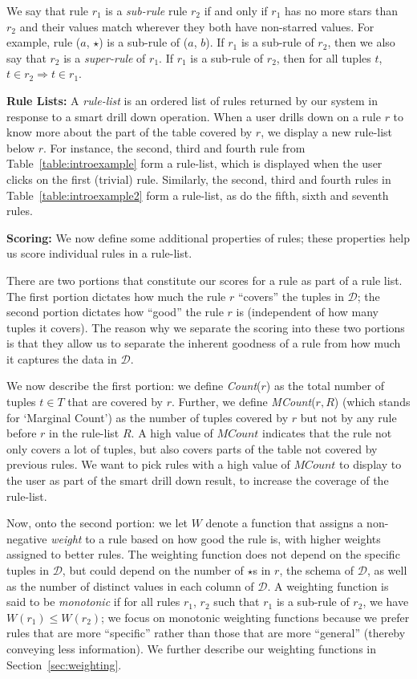 \documentclass[10pt,journal,compsoc]{IEEEtran}
\newcommand{\stitle}[1]{\vspace{0.5em}\noindent\textbf{#1}}
\newcommand{\calD}{\mathcal{D}\xspace}
\begin{document}
We say that rule $r_1$ is a {\em sub-rule} rule $r_2$ if and only if $r_1$ has no more stars than $r_2$ and their values match wherever they both have non-starred values. For example, rule ($a$, $\star$) is a sub-rule of ($a$, $b$). If $r_1$ is a sub-rule of $r_2$, then we also say that $r_2$ is a {\em super-rule} of $r_1$. If $r_1$ is a sub-rule of $r_2$, then for all tuples $t$, $t \in r_2 \Rightarrow t \in r_1$. 

\stitle{Rule Lists:}
A {\em rule-list} is an ordered list of rules returned by our system in response to a smart drill down operation. 
When a user drills down on a rule $r$ to know more about the part of the table covered by $r$, we display a new rule-list below $r$.
For instance, the second, third and fourth rule from Table~\ref{table:introexample} form a rule-list, which is displayed when the user clicks on the first (trivial) rule. Similarly, the second, third and fourth rules in Table~\ref{table:introexample2} form a rule-list, as do the fifth, sixth and seventh rules. 

\stitle{Scoring:} We now define some additional properties of rules; these properties
help us score individual rules in a rule-list. 

There are two portions that constitute our scores for a rule as part of a rule list. 
The first portion dictates how much the rule $r$ ``covers'' the tuples in $\calD$;
the second portion dictates how ``good'' the rule $r$ is (independent of how many
tuples it covers). 
The reason why we separate the scoring into these two portions is
that they allow us to separate the inherent goodness of a rule from
how much it captures the data in $\calD$.

We now describe the first portion:
we define {\em Count}($r$) as the total number of tuples $t \in T$ that are covered by $r$. 
Further, we define {\em MCount}($r, R$) (which stands for `Marginal Count') as the number of tuples covered by $r$ but not by any rule before $r$ in the rule-list $R$. A high value of $MCount$ indicates that the rule not only covers a lot of tuples, but also covers parts of the table not covered by previous rules. We want to pick rules with a high value of $MCount$ to display to the user
as part of the smart drill down result, to increase the coverage of the rule-list. 

Now, onto the second portion: we let $W$ denote a function that assigns a non-negative {\em weight} to a rule based on how good the rule is, with higher weights assigned to better rules. 
The weighting function does not depend on the specific
tuples in $\calD$, but could 
depend on the number of $\star$s in $r$,
the schema of $\calD$, 
as well as the number of distinct values in each column of $\calD$.
A weighting function is said to be {\em monotonic} if for all rules $r_1$, $r_2$ such that $r_1$ is a sub-rule of $r_2$, we have $W(r_1) \leq W(r_2)$; we focus
on monotonic weighting functions because we prefer 
rules that are more ``specific''
rather than those that are more ``general'' 
(thereby conveying less information).
We further describe our weighting functions in Section~\ref{sec:weighting}. 
\end{document}
